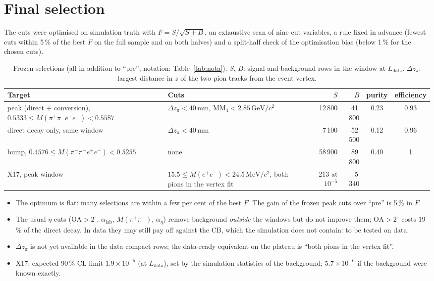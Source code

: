\documentclass[11pt,a4paper]{article}
\newcommand{\Mfour}{\ensuremath{M(\pi^{+}\pi^{-}e^{+}e^{-})}\xspace}
\newcommand{\Mee}{\ensuremath{M(e^{+}e^{-})}\xspace}
\newcommand{\Mpipi}{\ensuremath{M(\pi^{+}\pi^{-})}\xspace}
\newcommand{\GeVcc}{\ensuremath{\mathrm{GeV}/c^{2}}\xspace}
\newcommand{\MeVcc}{\ensuremath{\mathrm{MeV}/c^{2}}\xspace}
\newcommand{\Ldata}{\ensuremath{L_{\mathrm{data}}}\xspace}
\begin{document}
\section{Final selection}
The cuts were optimised on simulation truth with $F = S/\sqrt{S+B}$, an exhaustive scan of nine cut
variables, a rule fixed in advance (fewest cuts within 5\,\% of the best $F$ on the full sample and on
both halves) and a split-half check of the optimisation bias (below 1\,\% for the chosen cuts).

\begin{table}[H]
\centering
\caption{Frozen selections (all in addition to ``pre''; notation: Table~\ref{tab:nota}). $S$, $B$: signal and background rows in the
window at \Ldata. $\Delta z_\pi$: largest distance in $z$ of the two pion tracks from the event vertex.}
\label{tab:sel}
\small
\setlength{\tabcolsep}{4pt}
\begin{tabularx}{\textwidth}{@{}>{\raggedright\arraybackslash}p{4.3cm} L r r c c@{}}
\toprule
Target & Cuts & $S$ & $B$ & purity & efficiency \\
\midrule
peak (direct + conversion), $0.5333\le\Mfour<0.5587$ & $\Delta z_\pi<40$\,mm, $\mathrm{MM}_4<2.85$\,\GeVcc & 12\,800 & 41\,800 & 0.23 & 0.93 \\
direct decay only, same window & $\Delta z_\pi<40$\,mm & 7\,100 & 52\,500 & 0.12 & 0.96 \\
bump, $0.4576\le\Mfour<0.5255$ & none & 58\,900 & 89\,800 & 0.40 & 1 \\
X17, peak window & $15.5\le\Mee<24.5$\,\MeVcc, both pions in the vertex fit & 213 at $10^{-5}$ & 5\,340 & & \\
\bottomrule
\end{tabularx}
\end{table}

\begin{itemize}
\item The optimum is flat: many selections are within a few per cent of the best $F$. The gain of the frozen
      peak cuts over ``pre'' is 5\,\% in $F$.
\item The usual $\eta$ cuts (OA$>2^\circ$, $\alpha_{\mathrm{lab}}$, \Mpipi, $\alpha_\eta$) remove background
      \emph{outside} the windows but do not improve them; OA$>2^\circ$ costs 19\,\% of the direct decay. In data
      they may still pay off against the CB, which the simulation does not contain: to be tested on data.
\item $\Delta z_\pi$ is not yet available in the data compact rows; the data-ready equivalent on the plateau is
      ``both pions in the vertex fit''.
\item X17: expected 90\,\% CL limit $1.9\times10^{-5}$ (at \Ldata), set by the simulation statistics of the
      background; $5.7\times10^{-6}$ if the background were known exactly.
\end{itemize}
\end{document}
